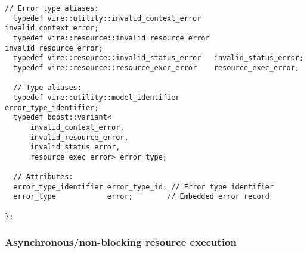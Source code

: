 \begin{itemize}
\begin{Verbatim}[frame=single,xleftmargin=0.cm,label=\fbox{C++}]
  // Error type aliases:
  typedef vire::utility::invalid_context_error   invalid_context_error;
  typedef vire::resource::invalid_resource_error invalid_resource_error;
  typedef vire::resource::invalid_status_error   invalid_status_error;
  typedef vire::resource::resource_exec_error    resource_exec_error;

  // Type aliases:
  typedef vire::utility::model_identifier        error_type_identifier;
  typedef boost::variant<
      invalid_context_error,
      invalid_resource_error,
      invalid_status_error,
      resource_exec_error> error_type;

  // Attributes:
  error_type_identifier error_type_id; // Error type identifier
  error_type            error;        // Embedded error record

};
\end{Verbatim}

\end{itemize}


\vfill
\pagebreak
\clearpage

\subsubsection{Asynchronous/non-blocking resource execution}

\begin{center}
\end{center}

